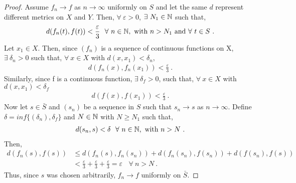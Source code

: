 \begin{questions}


\begin{solution}
  \begin{proof}
 Assume $f_n \rightarrow f$ as $n \rightarrow \infty$ uniformly on $S$ and let the same $d$ represent different metrics on $X$ and $Y$. Then, $\forall~\varepsilon > 0$, $\exists~N_1 \in \mathbb{N}$ such that,
 \begin{align*}
 d(f_n(t), f(t)) < \frac{ \varepsilon }{3} ~~ \forall~n \in \mathbb{N},~\text{with}~n > N_1~\text{and}~ \forall~t \in S~.
 \end{align*}
 Let $x_1 \in X$. Then, since $(f_n)$ is a sequence of continuous functions on X, $\exists~\delta_n > 0$ such that, $\forall~x \in X$ with  $d(x, x_1) < \delta_n$,
 \begin{align*}
d(f_n(x), f_n(x_1)) < \frac{\varepsilon}{3}~.
 \end{align*}
 Similarly, since f is a continuous function, $\exists~\delta_f > 0$, such that, $\forall~x \in X$ with $d(x, x_1) < \delta_f$
 \begin{align*}
 d(f(x),f(x_1)) < \frac{\varepsilon}{3}~.
 \end{align*}
 Now let $s \in \bar{S}$ and $(s_n)$ be a sequence in $S$ such that $s_n \rightarrow s$ as $n \rightarrow \infty$. Define $\delta = inf\{(\delta_n),\delta_f\}$ and $N \in \mathbb{N}$ with $N \geq N_1$ such that,
 \begin{align*}
 d(s_n, s) < \delta~~ \forall~n \in \mathbb{N},~\text{with}~ n > N~.
 \end{align*}
 Then,
 \begin{align*}
 d(f_n(s),f(s)) &\leq d(f_n(s),f_n(s_n)) + d(f_n(s_n), f(s_n)) + d(f(s_n),f(s)) \\
 & < \frac{\varepsilon}{3} + \frac{\varepsilon}{3} + \frac{\varepsilon}{3} = \varepsilon ~~~~ \forall~n > N~.
 \end{align*}
 Thus, since $s$ was chosen arbitrarily, $f_n \rightarrow f$ uniformly on $\bar{S}$.
 

  \end{proof}
\end{solution}


\end{questions}